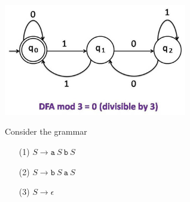 \documentclass[11pt]{amsart}
\begin{document}
\begin{enumerate}
\vspace{0.25cm}

\begin{center}
	\includegraphics[width=0.6\textwidth]{image(886).png}
\end{center}

\end{enumerate}

\vspace{.15in}

\newpage

 Consider the grammar 

\vspace{0.05in}

\begin{enumerate}

\item[(1)] $S\rightarrow \texttt{a}\ S \ \texttt{b}\ S$

\item[(2)] $S\rightarrow \texttt{b}\ S \ \texttt{a}\ S$

\item[(3)] $S\rightarrow \epsilon $

\end{enumerate}

\vspace{0.05in}
\end{document}
